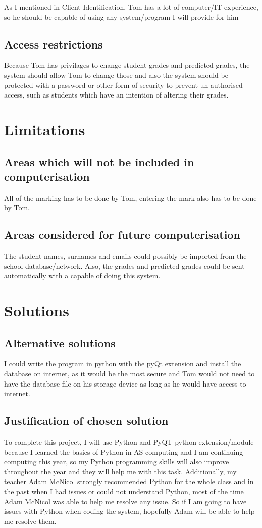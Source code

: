 As I mentioned in Client Identification, Tom has a lot of computer/IT experience, so he should be capable of using any system/program I will provide for him

\subsection{Access restrictions}
Because Tom has privilages to change student grades and predicted grades, the system should allow Tom to change those and also the system should be protected with a password or other form of security to prevent un-authorised access, such as students which have an intention of altering their grades.

\section{Limitations}

\subsection{Areas which will not be included in computerisation}
All of the marking has to be done by Tom, entering the mark also has to be done by Tom.

\subsection{Areas considered for future computerisation}
The student names, surnames and emails could possibly be imported from the school database/network. Also, the grades and predicted grades could be sent automatically with a capable of doing this system.

\section{Solutions}

\subsection{Alternative solutions}

I could write the program in python with the pyQt extension and install the database on internet, as it would be the most secure and Tom would not need to have the database file on his storage device as long as he would have access to internet.

\subsection{Justification of chosen solution}To complete this project, I will use Python and PyQT python extension/module because I learned the basics of Python in AS computing and I am continuing computing this year, so my Python programming skills will also improve throughout the year and they will help me with this task. Additionally, my teacher Adam McNicol strongly recommended Python for the whole class and in the past when I had issues or could not understand Python, most of the time Adam McNicol was able to help me resolve any issue. So if I am going to have issues with Python when coding the system, hopefully Adam will be able to help me resolve them.

